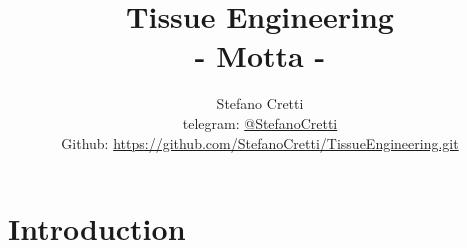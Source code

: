 
\title{\Huge\textbf{Tissue Engineering \\ - Motta -}}
\author{
  Stefano Cretti\\
  \small telegram: \href{https://t.me/StefanoCretti}{@StefanoCretti} \\[3pt]
\small Github: \href{https://github.com/StefanoCretti/TissueEngineering.git}{https://github.com/StefanoCretti/TissueEngineering.git}}


\maketitle
\tableofcontents
  
  \part{Introduction}
  
    
    



